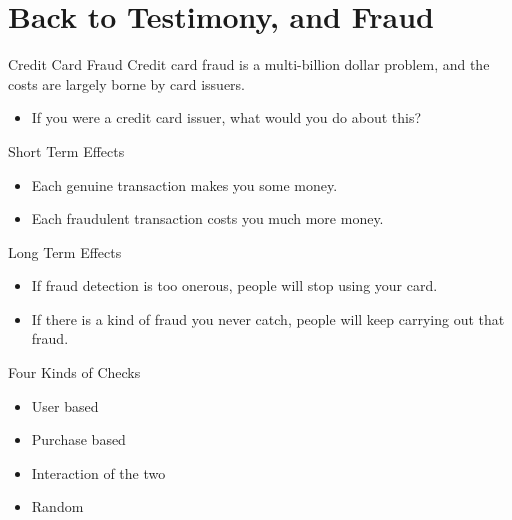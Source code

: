 \documentclass[
  17pt,
  letterpaper,
  ignorenonframetext,
  aspectratio=169,
  handout]{beamer}
\providecommand{\tightlist}{%
  \setlength{\itemsep}{0pt}\setlength{\parskip}{0pt}}\usepackage{longtable,booktabs,array}
\begin{document}
\hypertarget{back-to-testimony-and-fraud}{%
\section{Back to Testimony, and
Fraud}\label{back-to-testimony-and-fraud}}

\begin{frame}{Credit Card Fraud}
\protect\hypertarget{credit-card-fraud}{}
Credit card fraud is a multi-billion dollar problem, and the costs are
largely borne by card issuers.

\begin{itemize}[<+->]
\tightlist
\item
  If you were a credit card issuer, what would you do about this?
\end{itemize}
\end{frame}

\begin{frame}{Short Term Effects}
\protect\hypertarget{short-term-effects}{}
\begin{itemize}[<+->]
\tightlist
\item
  Each genuine transaction makes you some money.
\item
  Each fraudulent transaction costs you much more money.
\end{itemize}
\end{frame}

\begin{frame}{Long Term Effects}
\protect\hypertarget{long-term-effects}{}
\begin{itemize}[<+->]
\tightlist
\item
  If fraud detection is too onerous, people will stop using your card.
\item
  If there is a kind of fraud you never catch, people will keep carrying
  out that fraud.
\end{itemize}
\end{frame}

\begin{frame}{Four Kinds of Checks}
\protect\hypertarget{four-kinds-of-checks}{}
\begin{itemize}[<+->]
\tightlist
\item
  User based
\item
  Purchase based
\item
  Interaction of the two
\item
  Random
\end{itemize}
\end{frame}
\end{document}
